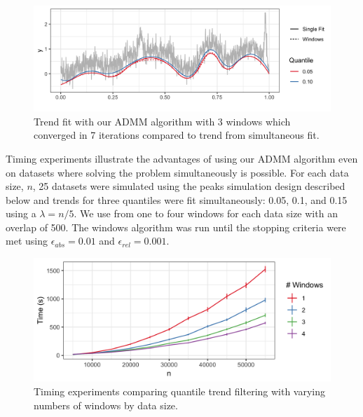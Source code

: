 \documentclass[12pt]{article}
\begin{document}
	
	\begin{figure}
		\centering
		\caption{Trend fit with our ADMM algorithm with 3 windows which converged in 7 iterations compared to trend from simultaneous fit.}
		\includegraphics[width = 0.8\linewidth]{Figures/admm_windows.png}
	\end{figure}

	Timing experiments illustrate the advantages of using our ADMM algorithm even on datasets where solving the problem simultaneously is possible. For each data size, $n$, 25 datasets were simulated using the peaks simulation design described below and trends for three quantiles were fit simultaneously: 0.05, 0.1, and 0.15 using a $\lambda = n/5$. We use from one to four windows for each data size with an overlap of 500. The windows algorithm was run until the stopping criteria were met using $\epsilon_{abs} = 0.01$ and $\epsilon_{rel} = 0.001$. 
	
	\begin{figure}[!h] 
		\centering
		\caption{Timing experiments comparing quantile trend filtering with varying numbers of windows by data size.}
		\includegraphics[width = 0.7\linewidth]{Figures/Fig_timing_experiment.png}
	\end{figure}
\end{document}
